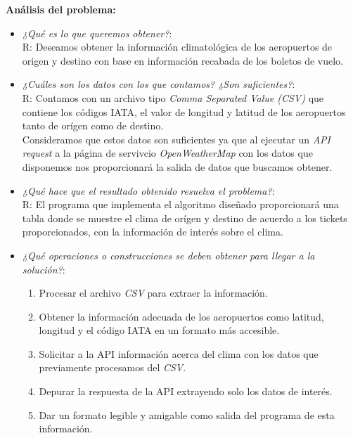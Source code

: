 {\textbf{Análisis del problema:}}
\begin{itemize}
  \item \textit{¿Qué es lo que queremos obtener?}:\\
        R: Deseamos obtener la información climatológica de los aeropuertos de origen y destino
        con base en información recabada de los boletos de vuelo.\\

  \item \textit{¿Cuáles son los datos con los que contamos? ¿Son suficientes?}:\\
        R: Contamos con un archivo tipo \textit{Comma Separated Value (CSV)} que contiene los
        códigos IATA, el valor de longitud y latitud de los aeropuertos tanto de orígen como de
        destino.\\
        Consideramos que estos datos son suficientes ya que al ejecutar un \textit{API request}
        a la página de servivcio \textit{OpenWeatherMap} con los datos que disponemos nos
        proporcionará la salida de datos que buscamos obtener.\\

  \item \textit{¿Qué hace que el resultado obtenido resuelva el problema?}:\\
        R: El programa que implementa el algoritmo diseñado proporcionará una tabla donde se
        muestre el clima de orígen y destino de acuerdo a los tickets proporcionados, con la
        información de
        interés sobre el clima.\\

  \item \textit{¿Qué operaciones o construcciones se deben obtener para llegar a la
        solución?}:
        \begin{enumerate}
          \item Procesar el archivo \textit{CSV} para extraer la información.

          \item Obtener la información adecuada de los aeropuertos como latitud, longitud y
                el código IATA en un formato más accesible.

          \item Solicitar a la API información acerca del clima con los datos que previamente
                procesamos del \textit{CSV}.

          \item Depurar la respuesta de la API extrayendo solo los datos de interés.

          \item Dar un formato legible y amigable como salida del programa de esta información.
        \end{enumerate}

\end{itemize}
